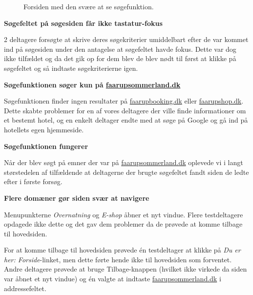 \documentclass[10pt,a4paper]{article}      %
\newcommand{\kommentar}[2]{\item[#1] \textbf{#2}\par\nopagebreak}{}
\newcommand\pic[1]{\texttt{[image: Pics/\#1]}}
\renewcommand\good{\pic{good}}
\renewcommand\smallproblem{\pic{smallproblem}}
\renewcommand\seriousproblem{\pic{seriousproblem}}
\begin{document}
\begin{kommentarer}
\begin{figure}[htbp]
    \centering
    \caption{Forsiden med den svære at se søgefunktion.}
    \label{fig:forside}
\end{figure}

\kommentar{\smallproblem}{Søgefeltet på søgesiden får ikke tastatur-fokus}

2 deltagere forsøgte at skrive deres søgekriterier umiddelbart efter de var
kommet ind på søgesiden under den antagelse at søgefeltet havde fokus. Dette
var dog ikke tilfældet og da det gik op for dem blev de blev nødt til først at
klikke på søgefeltet og så indtaste søgekriterierne igen.

\kommentar{\seriousproblem}{Søgefunktionen søger kun på \url{faarupsommerland.dk}}

Søgefunktionen finder ingen resultater på \url{faarupbooking.dk} eller
\url{faarupshop.dk}. Dette skabte problemer for en af vores deltagere der ville
finde informationer om et bestemt hotel, og en enkelt deltager endte med at
søge på Google og gå ind på hotellets egen hjemmeside.

\kommentar{\good}{Søgefunktionen fungerer}

Når der blev søgt på emner der var på \url{faarupsommerland.dk} oplevede vi i langt
størstedelen af tilfældende at deltagerne der brugte søgefeltet fandt siden de
ledte efter i første forsøg.

\kommentar{\seriousproblem}{Flere domæner gør siden svær at navigere}

Menupunkterne \emph{Overnatning} og \emph{E-shop} åbner et nyt vindue. Flere testdeltagere
opdagede ikke dette og det gav dem problemer da de prøvede at komme tilbage til hovedsiden.

For at komme tilbage til hovedsiden prøvede én testdeltager at klikke på
\emph{Du er her: Forside}-linket, men dette førte hende ikke til hovedsiden som
forventet. Andre deltagere prøvede at bruge Tilbage-knappen (hvilket ikke
virkede da siden var åbnet et nyt vindue) og én valgte at indtaste
\url{faarupsommerland.dk} i addressefeltet.


\end{kommentarer}
\end{document}
